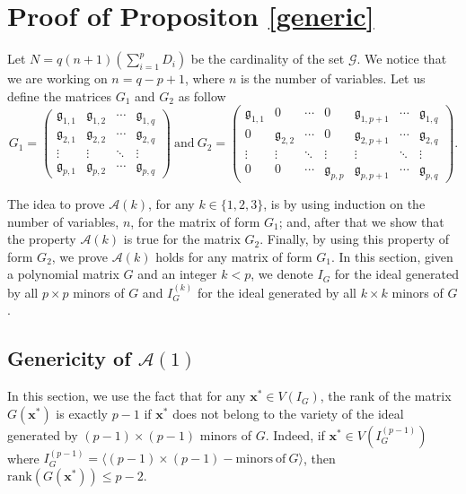 \documentclass[11pt]{article}
\numberwithin{Property}{section}
\numberwithin{Theorem}{section}
\numberwithin{Proposition}{section}
\numberwithin{Lemma}{section}
\numberwithin{Corollary}{section}
\numberwithin{Definition}{section}
\numberwithin{Remark}{section}
\numberwithin{Conjecture}{section}
\numberwithin{Problem}{section}
\numberwithin{Claim}{section}
\theoremstyle{definition}
\numberwithin{Example}{section}
\renewcommand{\leq}{\leqslant}
\begin{document}
\section{Proof of Propositon \ref{generic}}
\label{sec:proofgeneric}
Let $N = q(n+1)(\sum_{i=1}^pD_i)$ be the cardinality of the set $\mathcal{G}$. We notice that we are working on $n = q-p+1$, where $n$ is the number of variables. Let us define the matrices $G_1$ and $G_2$ as follow
\[G_1 = \left( \begin{matrix}
\mathfrak{g}_{1,1} & \mathfrak{g}_{1,2} & \cdots  & \mathfrak{g}_{1, q}\\
\mathfrak{g}_{2,1} & \mathfrak{g}_{2,2} & \cdots  & \mathfrak{g}_{2, q}\\
\vdots & \vdots & \ddots & \vdots \\
\mathfrak{g}_{p,1} & \mathfrak{g}_{p,2} & \cdots  & \mathfrak{g}_{p, q}
\end{matrix} \right) \ \mathrm{and} \ 
 G_2 = \left( \begin{matrix}
\mathfrak{g}_{1,1} & 0 & \cdots & 0 & \mathfrak{g}_{1,p+1} & \cdots & \mathfrak{g}_{1, q}\\
0 & \mathfrak{g}_{2,2} & \cdots & 0 & \mathfrak{g}_{2,p+1} & \cdots & \mathfrak{g}_{2, q}\\
\vdots & \vdots & \ddots & \vdots & \vdots & \ddots & \vdots\\
0 & 0 & \cdots & \mathfrak{g}_{p,p} & \mathfrak{g}_{p,p+1} & \cdots & \mathfrak{g}_{p, q}
\end{matrix} \right). \] 

The idea to prove $\mathcal{A}(k)$, for any $k \in \{1,2,3\}$, is by using induction on the number of variables, $n$, for the matrix of form $G_1$; and, after that we show that the property $\mathcal{A}(k)$ is true for the matrix $G_2$. Finally, by using this property of form $G_2$, we prove  $\mathcal{A}(k)$ holds for any matrix of form $G_1$. In this section, given a polynomial matrix $G$ and an integer $k < p$, we denote $I_G$ for the ideal generated by all $p \times p$ minors of $G$ and $I_G^{(k)}$ for the ideal generated by all $k \times k$ minors of $G$. 
\subsection{Genericity of $\mathcal{A}(1)$}
In this section, we use the fact that for any $\mathbf{x}^* \in V(I_G)$, the rank of the matrix $G(\mathbf{x}^*)$ is exactly $p-1$ if $\mathbf{x}^*$ does not belong to the variety of the ideal generated by $(p-1)\times (p-1)$ minors of $G$. Indeed, if $\mathbf{x}^* \in V(I_{G}^{(p-1)})$ where $I_{G}^{(p-1)} = \langle (p-1) \times (p-1) -\mathrm{minors \ of} \ G \rangle$, then $\mathrm{rank}(G(\mathbf{x}^*)) \leq p-2$.
\end{document}
